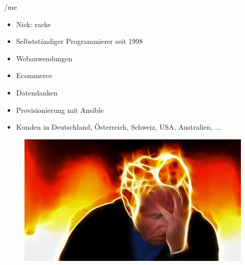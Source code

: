 
\maketitle

\begin{frame}
  \titlepage
\end{frame}

\cleardoublepage

\tableofcontents

\cleardoublepage



\begin{frame}{/me}
\begin{itemize}
\item Nick: racke
\item Selbstständiger Programmierer seit 1998
\item Webanwendungen
\item Ecommerce
\item Datendanken
\item Provisionierung mit Ansible
\item Kunden in Deutschland, Österreich, Schweiz, USA, Australien, ...
\end{itemize}
\end{frame}


\begin{frame}{}
\begin{figure}[!ht]
\centering
\includegraphics[width=1\linewidth]{img/stress.jpg}
\end{figure}
\end{frame}


